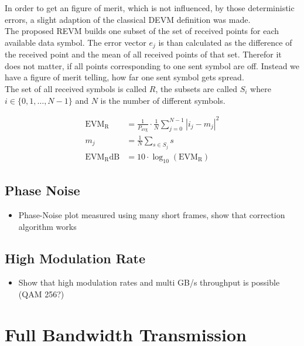 In order to get an figure of merit, which is not influenced, by those deterministic
errors, a slight adaption of the classical \gls{DEVM} definition was made. \\

The proposed \acrfull{REVM} builds one subset of the set of received points for
each available data symbol. The error vector $e_j$ is than calculated as the
difference of the received point and the mean of all received points of that
set. Therefor it does not matter, if all points corresponding to one sent symbol
are off. Instead we have a figure of merit telling, how far one sent symbol gets
spread. \\

The set of all received symbols is called $R$, the subsets are called $S_i$
where $i \in \{0, 1, \dots, N-1\}$ and $N$ is the number of different symbols.


\begin{align}
  \text{EVM}_\text{R} &= \frac{1}{P_{\text{avg}}} \cdot \frac{1}{N}
  \sum_{j=0}^{N-1} |i_j - m_j|^2
  \label{eq:devm} \\
  m_j &= \frac{1}{N} \sum_{s \in S_j} s \\
  \text{EVM}_\text{R}\text{dB} &= 10 \cdot \log_{10} (\text{EVM}_\text{R})
\end{align}



\subsection{Phase Noise}
\label{sec:res_450_phase}

\begin{itemize}
\item Phase-Noise plot measured using many short frames, show that correction algorithm works
\end{itemize}

\subsection{High Modulation Rate}
\begin{itemize}
\item Show that high modulation rates and multi GB/s throughput is possible (\gls{QAM} 256?)
\end{itemize}

\section{Full Bandwidth Transmission}
